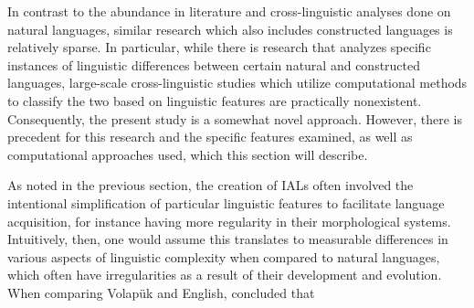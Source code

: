 \documentclass[12pt,a4paper]{article}
\numberwithin{figure}{section}
\numberwithin{table}{section}
\numberwithin{definition}{section}
\begin{document}

In contrast to the abundance in literature and cross-linguistic analyses done on natural languages, similar research which also includes constructed languages is relatively sparse. In particular, while there is research that analyzes specific instances of linguistic differences between certain natural and constructed languages, large-scale cross-linguistic studies which utilize computational methods to classify the two based on linguistic features are practically nonexistent. Consequently, the present study is a somewhat novel approach. However, there is precedent for this research and the specific features examined, as well as computational approaches used, which this section will describe.

As noted in the previous section, the creation of IALs often involved the intentional simplification of particular linguistic features to facilitate language acquisition, for instance having more regularity in their morphological systems. Intuitively, then, one would assume this translates to measurable differences in various aspects of linguistic complexity when compared to natural languages, which often have irregularities as a result of their development and evolution. When comparing Volapük and English, \textcite{GObbo2016} concluded that
\end{document}

